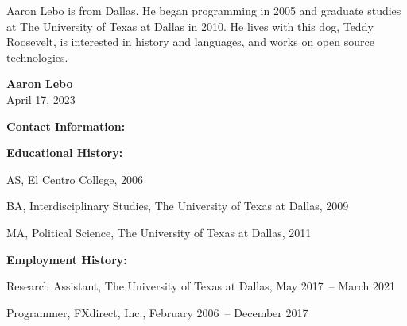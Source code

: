 \documentclass[doublespacing]{utdthesis}
\begin{document}
\begin{biosketch}
Aaron Lebo is from Dallas.
He began programming in 2005 and graduate studies at The University of Texas at Dallas in 2010.
He lives with this dog, Teddy Roosevelt, is interested in history and languages, and works on open source technologies.
\end{biosketch}

\begin{vita}
  \begin{center}
     {\LARGE\bfseries Aaron Lebo} \\[5pt]
     April 17, 2023
   \end{center}

   \bigskip

   {\large\bfseries Contact Information:\par}
   \medskip
   \noindent{}
   \hfil{}\par

   \bigskip

   {\large\bfseries Educational History:\par}
   \medskip
   AS, El Centro College, 2006\par
   BA, Interdisciplinary Studies, The University of Texas at Dallas, 2009\par
   MA, Political Science, The University of Texas at Dallas, 2011\par

   \bigskip

   {\large\bfseries Employment History:\par}
   \medskip
   Research Assistant, The University of Texas at Dallas,
     May 2017~-- March 2021\par
   Programmer, FXdirect, Inc.,
     February 2006~-- December 2017\par
  
\end{vita}
\end{document}
